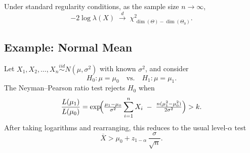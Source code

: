 Under standard regularity conditions, as the sample size $n\to\infty$,
\[
-2\log\lambda(X)
\;\xrightarrow{d}\;
\chi^2_{\,\dim(\Theta)-\dim(\Theta_0)}.
\]

\subsection{Example: Normal Mean}
Let $X_1,X_2,\dots,X_n \overset{iid}{\sim} N(\mu,\sigma^2)$ with known $\sigma^2$, and consider
\[
H_0:\mu=\mu_0
\quad\text{vs.}\quad
H_1:\mu=\mu_1.
\]
The Neyman–Pearson ratio test rejects $H_0$ when
\[
\frac{L(\mu_1)}{L(\mu_0)}
=
\exp\!\Bigl(\tfrac{\mu_1-\mu_0}{\sigma^2}\sum_{i=1}^n X_i
\;-\;\tfrac{n(\mu_1^2-\mu_0^2)}{2\sigma^2}\Bigr)
> k.
\]
After taking logarithms and rearranging, this reduces to the usual level‑$\alpha$ test
\[
\overline X > \mu_0 + z_{1-\alpha}\,\frac{\sigma}{\sqrt n}.
\]









